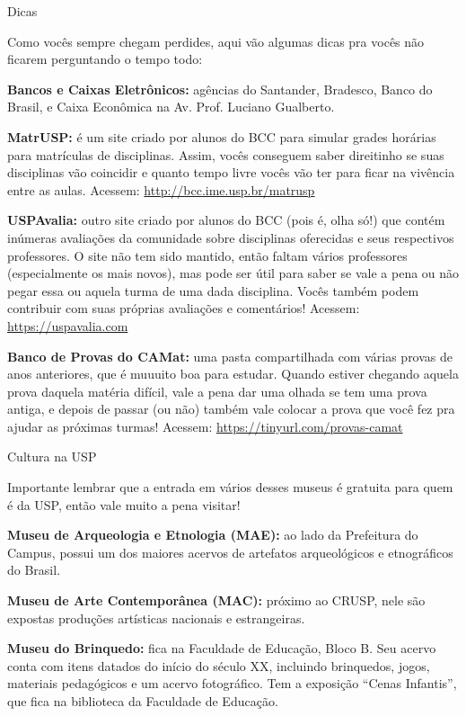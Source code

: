 \begin{secao}{Dicas}

Como vocês sempre chegam perdides, aqui vão algumas dicas pra vocês não
ficarem perguntando o tempo todo:

{\bf Bancos e Caixas Eletrônicos:} agências do Santander, Bradesco,
Banco do Brasil, e Caixa Econômica na Av. Prof. Luciano Gualberto.

{\bf MatrUSP:} é um site criado por alunos do BCC para simular grades horárias
para matrículas de disciplinas. Assim, vocês conseguem saber direitinho se suas
disciplinas vão coincidir e quanto tempo livre vocês vão ter para ficar na
vivência entre as aulas. Acessem: \url{http://bcc.ime.usp.br/matrusp}

{\bf USPAvalia:} outro site criado por alunos do BCC (pois é, olha só!) que
contém inúmeras avaliações da comunidade sobre disciplinas oferecidas e
seus respectivos professores. O site não tem sido mantido, então faltam vários
professores (especialmente os mais novos), mas pode ser útil para saber se vale a pena 
ou não pegar essa ou aquela turma de uma dada disciplina. Vocês também podem 
contribuir com suas próprias avaliações e comentários! Acessem: \url{https://uspavalia.com}

{\bf Banco de Provas do CAMat:} uma pasta compartilhada com várias provas de
anos anteriores, que é muuuito boa para estudar. Quando estiver chegando aquela
prova daquela matéria difícil, vale a pena dar uma olhada se tem uma prova antiga,
e depois de passar (ou não) também vale colocar a prova que você fez pra ajudar
as próximas turmas! Acessem: \url{https://tinyurl.com/provas-camat}

\begin{subsecao}{Cultura na USP}

Importante lembrar que a entrada em vários desses museus é gratuita para quem é da
USP, então vale muito a pena visitar!

{\bf Museu de Arqueologia e Etnologia (MAE):} ao lado da Prefeitura do Campus,
possui um dos maiores acervos de artefatos arqueológicos e etnográficos do Brasil.

{\bf Museu de Arte Contemporânea (MAC):} próximo ao CRUSP, nele são expostas
produções artísticas nacionais e estrangeiras.

{\bf Museu do Brinquedo:} fica na Faculdade de Educação, Bloco B. Seu acervo conta 
com itens datados do início do século XX, incluindo brinquedos, jogos, materiais
pedagógicos e um acervo fotográfico. Tem a exposição ``Cenas Infantis'', que fica na
biblioteca da Faculdade de Educação.


\end{subsecao}
\end{secao}

